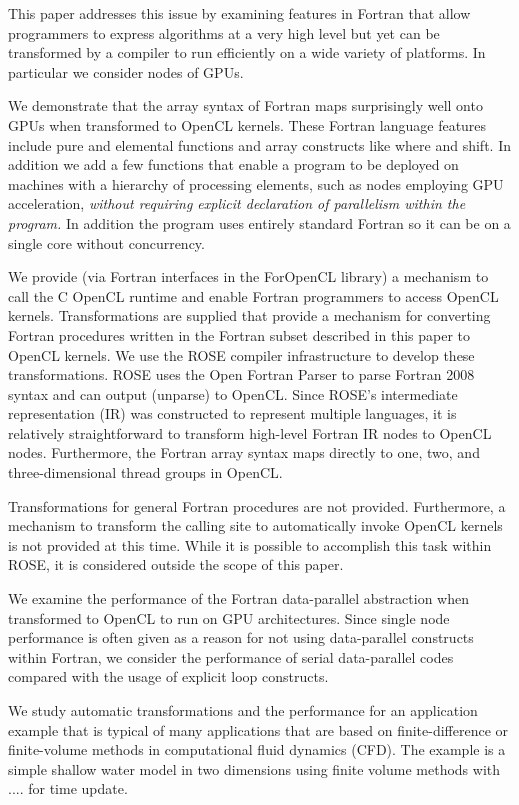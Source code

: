 This paper addresses this issue by examining features in Fortran that
allow programmers to express algorithms at a very high level but yet
can be transformed by a compiler to run efficiently on a wide variety
of platforms.  In particular we consider nodes of GPUs.

We demonstrate that the array syntax of Fortran maps surprisingly well
onto GPUs when transformed to OpenCL kernels.  These Fortran language
features include pure and elemental functions and array constructs
like where and shift.  In addition we add a few functions that enable
a program to be deployed on machines with a hierarchy of processing
elements, such as nodes employing GPU acceleration, \emph{without
  requiring explicit declaration of parallelism within the program.}
In addition the program uses entirely standard Fortran so it can be on
a single core without concurrency.

We provide (via Fortran interfaces in the ForOpenCL library) a mechanism to
call the C OpenCL runtime and enable Fortran programmers to access OpenCL
kernels.  Transformations are supplied that provide a mechanism for converting
Fortran procedures written in the Fortran subset described in this paper to
OpenCL kernels.  We use the ROSE compiler infrastructure \cite{} to develop
these transformations.  ROSE uses the Open Fortran Parser \cite{} to parse
Fortran 2008 syntax and can output (unparse) to OpenCL.  Since ROSE's
intermediate representation (IR) was constructed to represent multiple
languages, it is relatively straightforward to transform high-level Fortran IR
nodes to OpenCL nodes.  Furthermore, the Fortran array syntax maps directly to
one, two, and three-dimensional thread groups in OpenCL.

Transformations for general Fortran procedures are not provided.  Furthermore,
a mechanism to transform the calling site to automatically invoke
OpenCL kernels is not provided at this time.  While it is possible to
accomplish this task within ROSE, it is considered outside the scope of this
paper.

We examine the performance of the Fortran data-parallel abstraction when
transformed to OpenCL to run on GPU architectures.  Since single node performance
is often given as a reason for not using data-parallel constructs within Fortran,
we consider the performance of serial data-parallel codes compared with the
usage of explicit loop constructs.

We study automatic transformations and the performance for an
application example that is typical of many applications that are based on
finite-difference or finite-volume methods in computational fluid dynamics
(CFD).  The example is a simple shallow water model in two dimensions using
finite volume methods with .... for time update.


